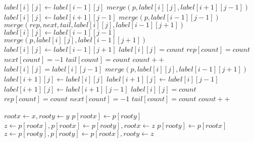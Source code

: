 \begin{algorithm*}

\begin{algorithmic}
						\State $label[i][j] \gets label[i-1][j]$
							\State $merge(p,label[i][j],label[i+1][j-1])$
						\EndIf
					\Else
							\State $label[i][j] \gets label[i+1][j-1]$
								\State $merge(p,label[i-1][j-1])$
							\EndIf
								\State $merge(rep,next,tail,label[i][j],label[i-1][j+1])$
							\EndIf
						\Else
								\State $label[i][j] \gets label[i-1][j-1]$
									\State $merge(p,label[i][j],label[i-1][j+1])$
								\EndIf
							\Else
									\State $label[i][j] \gets label[i-1][j+1]$
								\Else
									\State $label[i][j] = count$
									\State $rep[count] = count$
									\State $next[count] = -1$
									\State $tail[count] = count$
									\State $count++$	
								\EndIf
							\EndIf
						\EndIf
					\EndIf
				\Else
					\State $label[i][j] = label[i][j-1]$
							\State $merge(p,label[i][j],label[i-1][j+1])$
						\EndIf
					\EndIf
				\EndIf
					\State $label[i+1][j] \gets label[i][j]$
				\EndIf
			\Else
						\State $label[i+1][j] \gets label[i][j-1]$
					\Else
							\State $label[i+1][j] \gets label[i+1][j-1]$
						\Else
							\State $label[i][j] = count$
							\State $rep[count] = count$
							\State $next[count] = -1$
							\State $tail[count] = count$
							\State $count++$
						\EndIf
					\EndIf
				\EndIf
			\EndIf
		\EndFor
	\EndFor
\EndFunction
\end{algorithmic}	
\end{algorithm*}


 \begin{algorithm*}
 \begin{algorithmic}
	\State $rootx \gets x, rooty \gets y$
	\While { $p[rootx] \neq p[rooty]$ }
		\If {$p[rootx] > p[rooty]$}
			\If { $rootx = p[rootx]$ }
				\State $p[rootx] \gets p[rooty]$
				\State \Return{$p[rootx]$}
			\EndIf
			\State $z \gets p[rootx], p[rootx] \gets p[rooty], rootx \gets z$
		\Else
			\If { $rooty = p[rooty]$ }
				\State $p[rooty] \gets p[rootx]$
				\State \Return{$p[rootx]$}
			\EndIf
			\State $z \gets p[rooty], p[rooty] \gets p[rootx], rooty \gets z$
		\EndIf
	\EndWhile
	\State {}
\EndFunction
 \end{algorithmic}
 \end{algorithm*}
